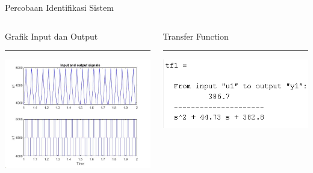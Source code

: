 \documentclass[10pt,xcolor={dvipsnames}]{beamer}
\begin{document}

%

\begin{frame}{Percobaan Identifikasi Sistem}
	\begin{columns}[T] %
		\begin{column}{0.48\textwidth}
			Grafik Input dan Output
			\color{black}\rule{\linewidth}{4pt}
			\includegraphics[width=7.5cm]{Coba Sistem Identification/timeplot.jpg}
		\end{column}%
		\hfill%
		\begin{column}{0.48\textwidth}
			Transfer Function
			\color{blue}\rule{\linewidth}{4pt}
			\begin{center}
				\includegraphics[width=7.5cm]{Coba Sistem Identification/hasiltf1.png}
			\end{center}
		\end{column}
	\end{columns}
\end{frame}
\end{document}
